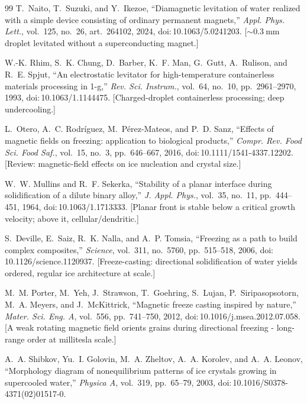 \documentclass[11pt]{article}
\theoremstyle{definition}
\begin{document}
\begin{thebibliography}{99}
T.~Naito, T.~Suzuki, and Y.~Ikezoe, ``Diamagnetic levitation of water realized with a simple
device consisting of ordinary permanent magnets,'' \emph{Appl. Phys. Lett.}, vol.~125,
no.~26, art.~264102, 2024, doi:\,10.1063/5.0241203. [${\sim}\qty{0.3}{\milli\meter}$ droplet
levitated without a superconducting magnet.]

W.-K. Rhim, S.~K. Chung, D.~Barber, K.~F. Man, G.~Gutt, A.~Rulison, and R.~E. Spjut, ``An
electrostatic levitator for high-temperature containerless materials processing in 1-g,''
\emph{Rev. Sci. Instrum.}, vol.~64, no.~10, pp.~2961--2970, 1993, doi:\,10.1063/1.1144475.
[Charged-droplet containerless processing; deep undercooling.]

L.~Otero, A.~C. Rodr\'iguez, M.~P\'erez-Mateos, and P.~D. Sanz, ``Effects of magnetic fields
on freezing: application to biological products,'' \emph{Compr. Rev. Food Sci. Food Saf.},
vol.~15, no.~3, pp.~646--667, 2016, doi:\,10.1111/1541-4337.12202. [Review: magnetic-field
effects on ice nucleation and crystal size.]

W.~W. Mullins and R.~F. Sekerka, ``Stability of a planar interface during solidification of a
dilute binary alloy,'' \emph{J. Appl. Phys.}, vol.~35, no.~11, pp.~444--451, 1964,
doi:\,10.1063/1.1713333. [Planar front is stable below a critical growth velocity; above it,
cellular/dendritic.]

S.~Deville, E.~Saiz, R.~K. Nalla, and A.~P. Tomsia, ``Freezing as a path to build complex
composites,'' \emph{Science}, vol.~311, no.~5760, pp.~515--518, 2006,
doi:\,10.1126/science.1120937. [Freeze-casting: directional solidification of water yields
ordered, regular ice architecture at scale.]

M.~M. Porter, M.~Yeh, J.~Strawson, T.~Goehring, S.~Lujan, P.~Siripasopsotorn, M.~A. Meyers,
and J.~McKittrick, ``Magnetic freeze casting inspired by nature,'' \emph{Mater. Sci. Eng. A},
vol.~556, pp.~741--750, 2012, doi:\,10.1016/j.msea.2012.07.058. [A weak rotating magnetic
field orients grains during directional freezing - long-range order at millitesla scale.]

A.~A. Shibkov, Yu.~I. Golovin, M.~A. Zheltov, A.~A. Korolev, and A.~A. Leonov, ``Morphology
diagram of nonequilibrium patterns of ice crystals growing in supercooled water,''
\emph{Physica A}, vol.~319, pp.~65--79, 2003, doi:\,10.1016/S0378-4371(02)01517-0.


\end{thebibliography}
\end{document}
